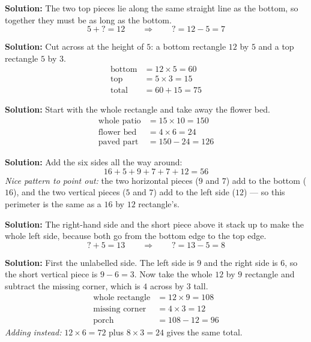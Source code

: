 \documentclass[12pt]{article}
\begin{document}
\textbf{Solution:} The two top pieces lie along the same straight line as the bottom, so together
they must be as long as the bottom.
\[ 5 + ? = 12 \qquad \Rightarrow \qquad ? = 12 - 5 = 7 \]

\textbf{Solution:} Cut across at the height of $5$: a bottom rectangle $12$ by $5$ and a top
rectangle $5$ by $3$.
\begin{align*}
\text{bottom} &= 12 \times 5 = 60 \\
\text{top} &= 5 \times 3 = 15 \\
\text{total} &= 60 + 15 = 75
\end{align*}

\textbf{Solution:} Start with the whole rectangle and take away the flower bed.
\begin{align*}
\text{whole patio} &= 15 \times 10 = 150 \\
\text{flower bed} &= 4 \times 6 = 24 \\
\text{paved part} &= 150 - 24 = 126
\end{align*}

\textbf{Solution:} Add the six sides all the way around:
\[ 16 + 5 + 9 + 7 + 7 + 12 = 56 \]
\emph{Nice pattern to point out:} the two horizontal pieces ($9$ and $7$) add to the bottom ($16$),
and the two vertical pieces ($5$ and $7$) add to the left side ($12$) --- so this perimeter is the
same as a $16$ by $12$ rectangle's.

\textbf{Solution:} The right-hand side and the short piece above it stack up to make the whole left
side, because both go from the bottom edge to the top edge.
\[ ? + 5 = 13 \qquad \Rightarrow \qquad ? = 13 - 5 = 8 \]

\textbf{Solution:} First the unlabelled side. The left side is $9$ and the right side is $6$, so the
short vertical piece is $9 - 6 = 3$. Now take the whole $12$ by $9$ rectangle and subtract the
missing corner, which is $4$ across by $3$ tall.
\begin{align*}
\text{whole rectangle} &= 12 \times 9 = 108 \\
\text{missing corner} &= 4 \times 3 = 12 \\
\text{porch} &= 108 - 12 = 96
\end{align*}
\emph{Adding instead:} $12 \times 6 = 72$ plus $8 \times 3 = 24$ gives the same total.
\end{document}
